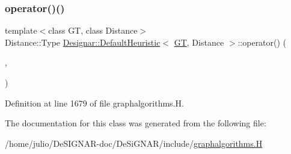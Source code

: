 \subsubsection{\texorpdfstring{operator()()}{operator()()}}
{\footnotesize\ttfamily template$<$class GT, class Distance$>$ \\
Distance\+::\+Type \hyperlink{class_designar_1_1_default_heuristic}{Designar\+::\+Default\+Heuristic}$<$ \hyperlink{demo-buildgraph_8_c_a3001c40d2c31ca87ed96cd7d1334a55e}{GT}, Distance $>$\+::operator() (\begin{DoxyParamCaption}\item[{typename \hyperlink{test-mtreenode_8_c_a17a24b0725f59987143c5faf63c4dc6f}{G\+T\+::\+Node} \&}]{,  }\item[{typename \hyperlink{test-mtreenode_8_c_a17a24b0725f59987143c5faf63c4dc6f}{G\+T\+::\+Node} \&}]{ }\end{DoxyParamCaption})\hspace{0.3cm}{\ttfamily [inline]}}



Definition at line 1679 of file graphalgorithms.\+H.



The documentation for this class was generated from the following file\+:\begin{DoxyCompactItemize}
\item 
/home/julio/\+De\+S\+I\+G\+N\+A\+R-\/doc/\+De\+Si\+G\+N\+A\+R/include/\hyperlink{graphalgorithms_8_h}{graphalgorithms.\+H}\end{DoxyCompactItemize}
